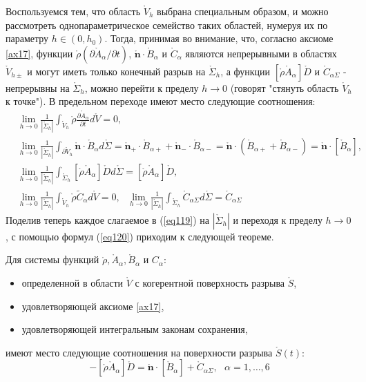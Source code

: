 Воспользуемся тем, что область $\mathring{V}_h$ выбрана специальным образом, и можно рассмотреть однопараметрическое семейство таких областей, нумеруя их по параметру $h \in (0, h_0)$. Тогда, принимая во внимание, что, согласно аксиоме \ref{ax17}, функции $\mathring{\rho}(\partial \mathring{A}_\alpha/\partial t)$, $\mathring{\mathbf{n}}\cdot\mathring{B}_\alpha$ и $\mathring{C}_\alpha$ являются непрерывными в областях $\mathring{V}_{h\pm}$ и могут иметь только конечный разрыв на $\mathring{\Sigma}_h$, а функции $[\mathring{\rho}\mathring{A}_\alpha]\mathring{D}$ и $\mathring{C}_{\alpha\Sigma}$ - непрерывны на $\mathring{\Sigma}_h$, можно перейти к пределу $h\to0$ (говорят "стянуть область $\mathring{V}_h$ к точке"). В предельном переходе имеют место следующие соотношения:
\begin{equation}\label{eq120}
\begin{aligned}
	&\lim_{ h \to 0} \frac{1}{|\mathring{\Sigma}_{h}|}\int_{\mathring{V}_{h}}\mathring{\rho}\frac{\partial \mathring{A}_{\alpha}}{\partial t}d\mathring{V}=0,
	\\
	&\lim_{ h \to 0 }  \frac{1}{|\mathring{\Sigma}_{h}|}\int_{\partial\mathring{V}_{h}}\mathbf{\mathring{n}}\cdot \mathring{B}_{\alpha}d\mathring{\Sigma}=\mathbf{\mathring{n}}_{+}\cdot\mathring{B}_{\alpha+}+\mathbf{\mathring{n}}_{-}\cdot\mathring{B}_{\alpha-}=\mathbf{\mathring{n}}\cdot(\mathring{B}_{\alpha+}+\mathring{B}_{\alpha-})=\mathbf{\mathring{n}}\cdot[\mathring{B}_{\alpha}],
	\\
	&\lim_{ h \to 0} \frac{1}{|\mathring{\Sigma}_{h}|}\int_{\mathring{\Sigma}_{h}}[\mathring{\rho}\mathring{A}_{\alpha}]\mathring{D}d\mathring{\Sigma}=[\mathring{\rho}\mathring{A}_{\alpha}]\mathring{D},\\
	&\lim_{ h \to 0} \frac{1}{|\mathring{\Sigma}_{h}|}\int_{\mathring{V}_{h}}\mathring{\rho}\tilde{C}_{\alpha}d\mathring{V}=0,~~~\lim_{ h \to 0} \frac{1}{|\mathring{\Sigma}_{h}|}\int_{\mathring{\Sigma}_{h}}\mathring{C}_{\alpha\Sigma}d\mathring{\Sigma}=\mathring{C}_{\alpha\Sigma}
\end{aligned}
\end{equation}
Поделив теперь каждое слагаемое в (\ref{eq119}) на $|\mathring{\Sigma}_h|$ и переходя к пределу $h\to 0$, с помощью формул (\ref{eq120}) приходим к следующей теореме.
\begin{theorem}
	Для системы функций $\mathring{\rho},\mathring{A}_{\alpha}, \mathring{B}_\alpha$ и $C_\alpha$:
	\begin{itemize}
		\item определенной в области $\mathring{V}$ с когерентной поверхность разрыва $\mathring{S}$,
		\item удовлетворяющей аксиоме \ref{ax17},
		\item удовлетворяющей интегральным законам сохранения,
	\end{itemize}
	имеют место следующие соотношения на поверхности разрыва $\mathring{S}(t)$:
	\begin{equation}
		-[\mathring{\rho}\mathring{A}_\alpha]\mathring{D}=\mathring{\mathbf{n}}\cdot[\mathring{B}_\alpha]+\mathring{C}_{\alpha\Sigma},~~~\alpha=1,\dots,6
	\end{equation}
\end{theorem}